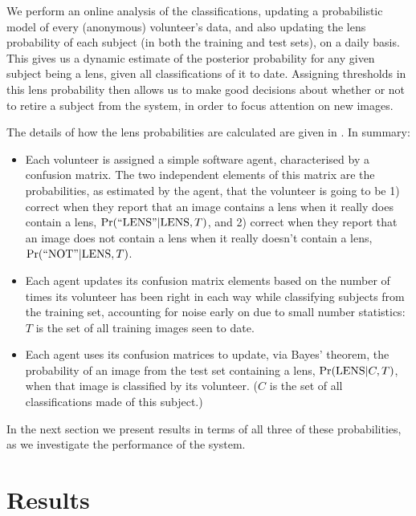 \documentclass[useAMS,usenatbib,a4paper]{mn2e}
\begin{document}
We perform an online analysis of the classifications,  updating a
probabilistic model of every (anonymous) volunteer's data, and also updating
the lens probability of each subject  (in both the training and test sets), on
a daily basis. This gives us a dynamic estimate of the posterior probability
for  any given  subject being a lens, given all classifications of it to date.
Assigning thresholds in this lens probability then allows us to make good
decisions about whether or not to retire a subject from the system, in order to
focus attention on new images. 

The details of how the lens probabilities are calculated are given in
. In summary:
\begin{itemize}

\item Each volunteer is assigned a simple software agent, characterised by a
confusion matrix. The two independent elements of this matrix are the
probabilities, as estimated by the agent, that the volunteer is going to be 1)
correct when they report that an image contains a lens when it really does
contain a lens, ${\rm Pr}({\rm ``LENS"}|{\rm LENS},T)$, and 2) correct when they report that
an image does not contain a lens when it really doesn't contain a lens,
${\rm Pr}({\rm ``NOT"}|{\rm LENS},T)$.

\item Each agent updates its confusion matrix elements based on the number of
times its volunteer has been right in each way while classifying subjects from
the training set, accounting for noise early on due to small number
statistics: $T$ is the set of all training images seen to date.

\item Each agent uses its confusion matrices to update, via Bayes' theorem,
the probability of an image from the test set containing a lens,
${\rm Pr}({\rm LENS}|C,T)$, when that image is classified by its volunteer. ($C$ is the
set of all classifications made of this subject.)

\end{itemize}

In the next section we present results in terms of all three of these
probabilities, as we investigate the performance of the \SW system.


\section{Results}
\label{sec:results}
\end{document}
